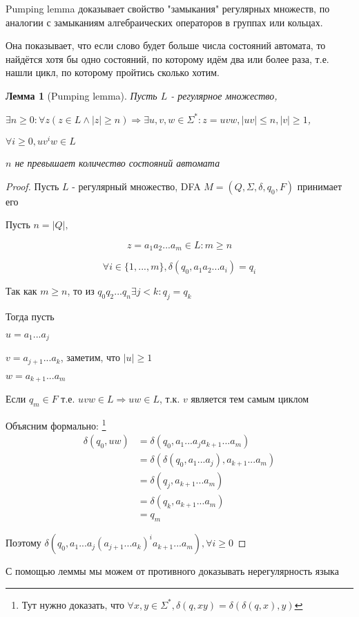 \documentclass[5pt]{article}
\newtheorem{lemma}{Лемма}
\begin{document}
Pumping lemma доказывает свойство "замыкания" регулярных множеств, по аналогии с замыканиям алгебраических операторов в группах или кольцах.

Она показывает, что если слово будет больше числа состояний автомата, то найдётся хотя бы одно состояний, по которому идём два или более раза, т.е. нашли цикл, по которому пройтись сколько хотим.

\begin{lemma}[Pumping lemma]
  Пусть $L$ - регулярное множество,

  $\exists n \geq 0 : \forall z (z \in L \land |z| \geq n) 

\Rightarrow
  \exists u,v,w \in \Sigma^* : z = uvw, |uv| \leq n, |v| \geq 1$,

  $\forall i \geq 0, uv^iw \in L$


  $n$ не превышает количество состояний автомата
\end{lemma}
\begin{proof}
  Пусть $L$ - регулярный множество, DFA $M = (Q, \Sigma, \delta ,q_0, F)$ принимает его 

  Пусть $n = |Q|,$

  $$z = a_1a_2...a_m \in L :  m \geq n$$

  $$\forall i \in \{1, ..., m\}, \delta(q_0, a_1a_2...a_i) = q_i$$

  Так как $m \geq n$, то из $q_0q_2...q_n \exists j < k : q_j = q_k$

  Тогда пусть

  $u = a_1...a_j$

  $v = a_{j+1}...a_k$, заметим, что $|u| \geq 1$

  $w = a_{k+1}...a_m$

  Если $q_m \in F$ т.е. $uvw \in L \Rightarrow uw \in L$, т.к. $v$ является тем самым циклом

  Объясним формально: \footnote{Тут нужно доказать, что $\forall x, y \in \Sigma^*, \delta(q, xy) = \delta(\delta(q, x), y)$}
  \[
    \begin{split}
      \delta(q_0, uw) & = \delta(q_0, a_1...a_ja_{k+1}...a_m) \\
      & = \delta(\delta(q_0, a_1...a_j),a_{k+1}...a_m) \\
      & = \delta(q_j,a_{k+1}...a_m) \\
      & = \delta(q_k,a_{k+1}...a_m) \\
      & = q_m
    \end{split}
  \]

  Поэтому 
  $\delta(q_0, a_1...a_j(a_{j+1}...a_k)^ia_{k+1}...a_m),  \forall i \geq 0$

\end{proof}

С помощью леммы мы можем от противного доказывать нерегулярность языка
\end{document}
